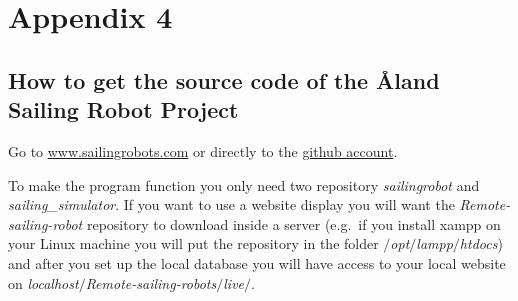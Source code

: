 \documentclass[twoside,12pt]{report} %
\begin{document}
\chapter*{Appendix 4}

\section*{How to get the source code of the \r{A}land Sailing Robot Project}


Go to \href{www.sailingrobots.com}{www.sailingrobots.com} or directly to the  \href{https://github.com/AlandSailingRobots}{github account}. 

To make the program function you only need two repository \textit{sailingrobot} and \textit{sailing\_simulator}. If you want to use a website display you will want the \textit{Remote-sailing-robot} repository to download inside a server (e.g.\ if you install xampp on your Linux machine you will put the repository in the folder \textit{$\slash$opt$\slash$lampp$\slash$htdocs}) and after you set up the local database you will have access to your local website on \textit{localhost$\slash$Remote-sailing-robots$\slash$live$\slash$}.

%


\nocite{*}


\end{document}

